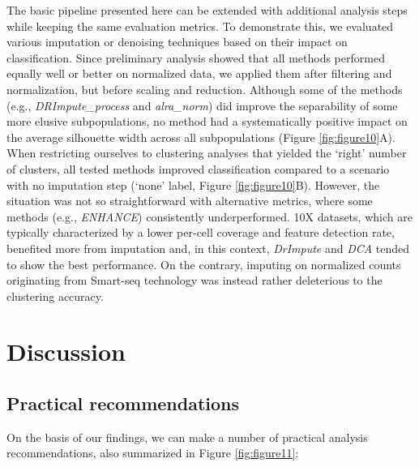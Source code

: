 \documentclass{bmcart}
\begin{document}
The basic pipeline presented here can be extended with additional analysis steps while keeping the same evaluation metrics. To demonstrate this, we evaluated various imputation or denoising techniques based on their impact on classification. Since preliminary analysis showed that all methods performed equally well or better on normalized data, we applied them after filtering and normalization, but before scaling and reduction. Although some of the methods (e.g., \textit{DRImpute\_process} and \textit{alra\_norm}) did improve the separability of some more elusive subpopulations, no method had a systematically positive impact on the average silhouette width across all subpopulations (Figure \ref{fig:figure10}A). When restricting ourselves to clustering analyses that yielded the `right' number of clusters, all tested methods improved classification  compared to a scenario with no imputation step (`none' label, Figure \ref{fig:figure10}B). However, the situation was not so straightforward with alternative metrics, where some methods (e.g., \textit{ENHANCE}) consistently underperformed. 10X datasets, which are typically characterized by a lower per-cell coverage and feature detection rate, benefited more from imputation and, in this context, \textit{DrImpute} and \textit{DCA} tended to show the best performance. On the contrary, imputing on normalized counts originating from Smart-seq technology was instead rather deleterious to the clustering accuracy. 


\section*{Discussion}

\subsection*{Practical recommendations}

On the basis of our findings, we can make a number of practical analysis recommendations, also summarized in Figure \ref{fig:figure11}:
\end{document}

